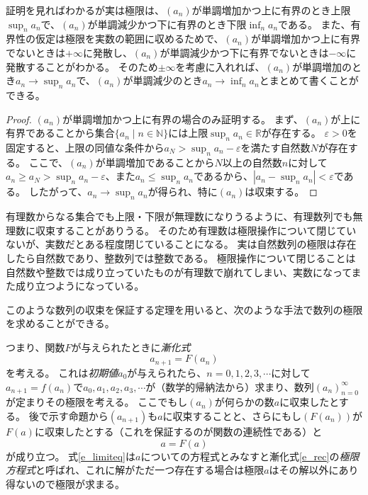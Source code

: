 \begin{remark}
証明を見ればわかるが実は極限は、$(a_n)$が単調増加かつ上に有界のとき上限$\sup_n a_n$で、$(a_n)$が単調減少かつ下に有界のとき下限$\inf_n a_n$である。
また、有界性の仮定は極限を実数の範囲に収めるためで、$(a_n)$が単調増加かつ上に有界でないときは$+\infty$に発散し、$(a_n)$が単調減少かつ下に有界でないときは$-\infty$に発散することがわかる。
そのため$\pm \infty$を考慮に入れれば、$(a_n)$が単調増加のとき$a_n \to \sup_n a_n$で、$(a_n)$が単調減少のとき$a_n \to \inf_n a_n$とまとめて書くことができる。
\end{remark}

\begin{proof}
$(a_n)$が単調増加かつ上に有界の場合のみ証明する。
まず、$(a_n)$が上に有界であることから集合$\{ a_n \mid n \in \mathbb{N} \}$には上限$\sup_n a_n \in \mathbb{R}$が存在する。
$\varepsilon > 0$を固定すると、上限の同値な条件から$a_N > \sup_n a_n-\varepsilon$を満たす自然数$N$が存在する。
ここで、$(a_n)$が単調増加であることから$N$以上の自然数$n$に対して$a_n \ge a_N > \sup_n a_n-\varepsilon$、また$a_n \le \sup_n a_n$であるから、$|a_n-\sup_n a_n| < \varepsilon$である。
したがって、$a_n \to \sup_n a_n$が得られ、特に$(a_n)$は収束する。
\end{proof}

有理数からなる集合でも上限・下限が無理数になりうるように、有理数列でも無理数に収束することがありうる。
そのため有理数は極限操作について閉じていないが、実数だとある程度閉じていることになる。
実は自然数列の極限は存在したら自然数であり、整数列では整数である。
極限操作について閉じることは自然数や整数では成り立っていたものが有理数で崩れてしまい、実数になってまた成り立つようになっている。

このような数列の収束を保証する定理を用いると、次のような手法で数列の極限を求めることができる。

つまり、関数$F$が与えられたときに\emph{漸化式}
\begin{equation}
\label{e_rec}
a_{n+1} = F(a_n)
\end{equation}
を考える。
これは\emph{初期値}$a_0$が与えられたら、$n = 0, 1, 2, 3, \cdots$に対して$a_{n+1} = f(a_n)$で$a_0, a_1, a_2, a_3, \cdots$が（数学的帰納法から）求まり、数列$(a_n)_{n = 0}^\infty$が定まりその極限を考える。
ここでもし$(a_n)$が何らかの数$a$に収束したとする。
後で示す命題から$(a_{n+1})$も$a$に収束することと、さらにもし$(F(a_n))$が$F(a)$に収束したとする（これを保証するのが関数の連続性である）と
\begin{equation}
\label{e_limiteq}
a = F(a)
\end{equation}
が成り立つ。
式\eqref{e_limiteq}は$a$についての方程式とみなすと漸化式\eqref{e_rec}の\emph{極限方程式}と呼ばれ、これに解がただ一つ存在する場合は極限$a$はその解以外にあり得ないので極限が求まる。

